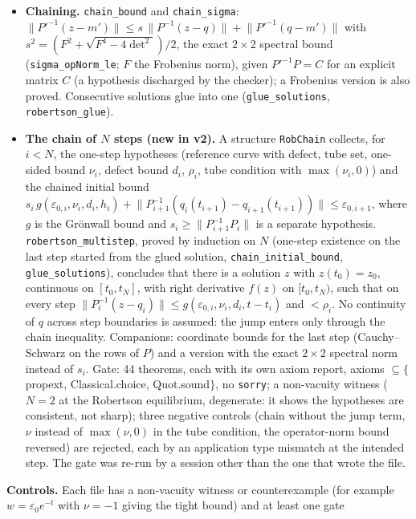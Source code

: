 \documentclass[11pt]{article}
\newcommand{\nrm}[1]{\lVert #1\rVert}
\begin{document}
\begin{itemize}
does not discharge it separately (it is trivially satisfiable for a polynomial on a compact interval).
\item \textbf{Chaining.} \texttt{chain\_bound} and \texttt{chain\_sigma}: $\nrm{P'^{-1}(z-m')}\le s\,\nrm{P^{-1}(z-q)}+\nrm{P'^{-1}(q-m')}$ with $s^2=(F^2+\sqrt{F^4-4\det^2})/2$,
the exact $2\times2$ spectral bound (\texttt{sigma\_opNorm\_le}; $F$ the Frobenius norm), given $P'^{-1}P=C$ for an explicit matrix $C$ (a hypothesis discharged by the
checker); a Frobenius version is also proved. Consecutive solutions glue into one (\texttt{glue\_solutions}, \texttt{robertson\_glue}).
\item \textbf{The chain of $N$ steps (new in v2).} A structure \texttt{RobChain} collects, for $i<N$, the one-step hypotheses (reference curve with defect, tube set, one-sided bound $\nu_i$, defect bound $d_i$, $\rho_i$,
tube condition with $\max(\nu_i,0)$) and the chained initial bound $s_i\,g(\varepsilon_{0,i},\nu_i,d_i,h_i)+\nrm{P_{i+1}^{-1}(q_i(t_{i+1})-q_{i+1}(t_{i+1}))}\le\varepsilon_{0,i+1}$, where $g$ is the Gr\"onwall bound and
$s_i\ge\nrm{P_{i+1}^{-1}P_i}$ is a separate hypothesis. \texttt{robertson\_multistep}, proved by induction on $N$ (one-step existence on the last step started from the glued solution, \texttt{chain\_initial\_bound}, \texttt{glue\_solutions}), concludes that there is a
solution $z$ with $z(t_0)=z_0$, continuous on $[t_0,t_N]$, with right derivative $f(z)$ on $[t_0,t_N)$, such that on every step $\nrm{P_i^{-1}(z-q_i)}\le g(\varepsilon_{0,i},\nu_i,d_i,t-t_i)$ and $<\rho_i$.
No continuity of $q$ across step boundaries is assumed: the jump enters only through the chain inequality. Companions: coordinate bounds for the last step (Cauchy--Schwarz on the rows of $P$) and a version with the exact $2\times2$ spectral norm instead of $s_i$.
Gate: 44 theorems, each with its own axiom report, axioms $\subseteq\{$propext, Classical.choice, Quot.sound$\}$, no \texttt{sorry}; a non-vacuity witness ($N=2$ at the Robertson equilibrium, degenerate: it shows the hypotheses are consistent, not sharp);
three negative controls (chain without the jump term, $\nu$ instead of $\max(\nu,0)$ in the tube condition, the operator-norm bound reversed) are rejected, each by an application type mismatch at the intended step. The gate was re-run by a session other than the one that wrote the file.
\end{itemize}
\textbf{Controls.} Each file has a non-vacuity witness or counterexample (for example $w=\varepsilon_0e^{-t}$ with $\nu=-1$ giving the tight bound) and at least one gate
\end{document}
